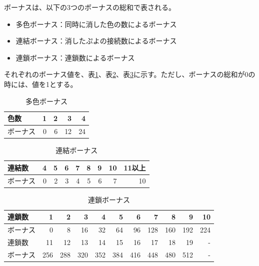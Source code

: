 \documentclass[12pt]{jsarticle}
\begin{document}
ボーナスは、以下の3つのボーナスの総和で表される。
\begin{itemize}
\item 多色ボーナス：同時に消した色の数によるボーナス
\item 連結ボーナス：消したぷよの接続数によるボーナス
\item 連鎖ボーナス：連鎖数によるボーナス
\end{itemize}
それぞれのボーナス値を、表\ref{tab:color_bonus}、表\ref{tab:connect_bonus}、表\ref{tab:chain_bonus}に示す。ただし、ボーナスの総和が0の時には、値を1とする。

\begin{table}[htb]
\begin{center}
\caption{多色ボーナス} \label{tab:color_bonus}
\begin{tabular}{|l|r|r|r|r|} \hline
色数 & 1 & 2 & 3 & 4\\ \hline
ボーナス & 0 & 6 & 12 & 24\\ \hline
\end{tabular}
\end{center}
\end{table}

\begin{table}[htb]
\begin{center}
\caption{連結ボーナス} \label{tab:connect_bonus}
\begin{tabular}{|l|r|r|r|r|r|r|r|r|} \hline
連結数 & 4 & 5 & 6 & 7 & 8 & 9 & 10 & 11以上\\ \hline
ボーナス & 0 & 2 & 3 & 4 & 5 & 6 & 7 & 10\\ \hline
\end{tabular}
\end{center}
\end{table}

\begin{table}[htb]
\begin{center}
\caption{連鎖ボーナス} \label{tab:chain_bonus}
\begin{tabular}{|l|r|r|r|r|r|r|r|r|r|r|} \hline
連鎖数 & 1 & 2 & 3 & 4 & 5 & 6 & 7 & 8 & 9 & 10\\ \hline
ボーナス & 0 & 8 & 16 & 32 & 64 & 96 & 128 & 160 & 192 & 224\\ \hline
連鎖数 & 11 & 12 & 13 & 14 & 15 & 16 & 17 & 18 & 19 & -\\ \hline
ボーナス & 256 & 288 & 320 & 352 & 384 & 416 & 448 & 480 & 512 & -\\ \hline
\end{tabular}
\end{center}
\end{table}
\end{document}
